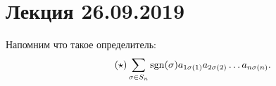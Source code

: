 \section{Лекция 26.09.2019}

Напомним что такое определитель:
\begin{equation}
    \label{det:sum}
    \tag{$\star$}
    \sum_{\sigma \in S_n} \sgn(\sigma) a_{1\sigma(1)} a_{2\sigma(2)} \dots a_{n\sigma(n)}
.\end{equation}

\setcounter{theorem}{1}
\begin{comment}
    Каждое слагаемое содержит ровно 1 элемент из каждой строки и ровно 1 элемент из каждого столбца.
\end{comment}

